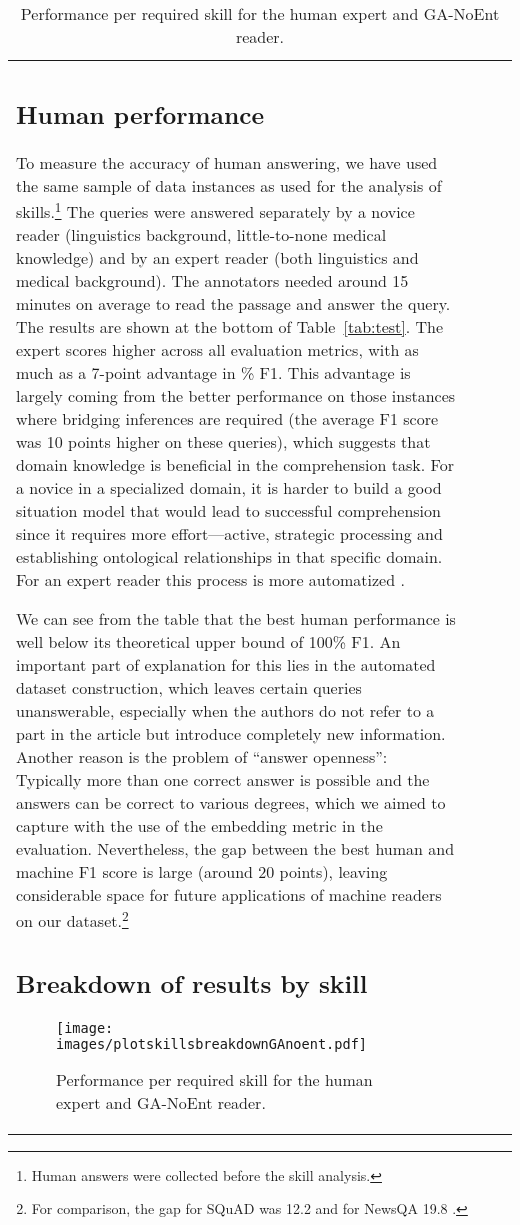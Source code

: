 \documentclass[11pt,a4paper]{article}
\begin{document}
\begin{table}[t]
\begin{tabular}{p{2.7cm} p{1.8cm} l r}
{\subsection{Human performance}
To measure the accuracy of human answering, we have used the same sample of data instances as used for the analysis of skills.\footnote{Human answers were collected before the skill analysis.} The queries were answered separately by a novice reader (linguistics background, little-to-none medical knowledge) and by an expert reader (both linguistics and medical background). The annotators needed around 15 minutes on average to read the passage and answer the query. The results are shown at the bottom of Table~\ref{tab:test}. The expert scores higher across all evaluation metrics, with as much as a 7-point advantage in \% F1. This advantage is largely coming from the better performance on those instances where bridging inferences are required (the average F1 score was 10 points higher on these queries), which suggests that domain knowledge is beneficial in the comprehension task. For a novice in a specialized domain, it is harder to build a good situation model that would lead to successful comprehension since it requires more effort---active, strategic processing and establishing ontological relationships in that specific domain. For an expert reader this process is more automatized \citep{KintschAndRawson2008}.

We can see from the table that the best human performance is well below its theoretical upper bound of 100\% F1. An important part of explanation for this lies in the automated dataset construction, which leaves certain queries unanswerable, especially when the authors do not refer to a part in the article but introduce completely new information. Another reason is the problem of \enquote{answer openness}: Typically more than one correct answer is possible and the answers can be correct to various degrees, which we aimed to capture with the use of the embedding metric in the evaluation. Nevertheless, the gap between the best human and machine F1 score is large (around 20 points), leaving considerable space for future applications of machine readers on our dataset.\footnote{For comparison, the gap for SQuAD was 12.2 and for NewsQA 19.8 \citep{TrischlerEtAl2016}.}

\subsection{Breakdown of results by skill}
\begin{figure}
\begin{center}
\texttt{[image: images/plotskillsbreakdownGAnoent.pdf]}
\caption{Performance per required skill for the human expert and GA-NoEnt reader.}
\label{fig:plotskillsbreakdown}
\end{center}
\end{figure}

}
\end{tabular}
\end{table}
\end{document}
